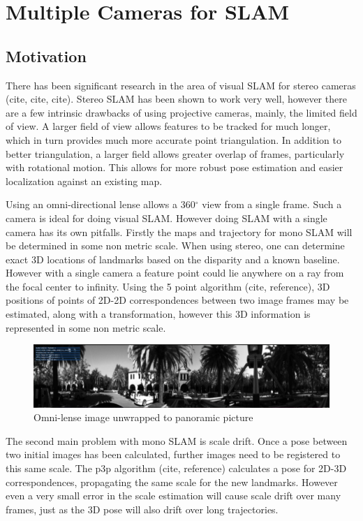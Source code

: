 \chapter{Multiple Cameras for SLAM}
\label{chapter:MultiCamSLAM}

\section{Motivation}

There has been significant research in the area of visual SLAM for stereo cameras (cite, cite, cite).  Stereo SLAM has been shown to work very well, however there are a few intrinsic drawbacks of using projective cameras, mainly, the limited field of view.  A larger field of view allows features to be tracked for much longer, which in turn provides much more accurate point triangulation.  In addition to better triangulation, a larger field allows greater overlap of frames, particularly with rotational motion.  This allows for more robust pose estimation and easier localization against an existing map. %

Using an omni-directional lense allows a 360$^{\circ}$ view from a single frame.  Such a camera is ideal for doing visual SLAM.  However doing SLAM with a single camera has its own pitfalls.  Firstly the maps and trajectory for mono SLAM will be determined in some non metric scale.  When using stereo, one can determine exact 3D locations of landmarks based on the disparity and a known baseline.  However with a single camera a feature point could lie anywhere on a ray from the focal center to infinity.  Using the 5 point algorithm (cite, reference), 3D positions of points of 2D-2D correspondences between two image frames may be estimated, along with a transformation, however this 3D information is represented in some non metric scale.

\begin{figure}[h!]
  \centering
    \includegraphics[width=1.0\textwidth]{chapters/images/unwrapped}
    \caption{Omni-lense image unwrapped to panoramic picture}
  \label{fig:unwrapped}
\end{figure}

The second main problem with mono SLAM is scale drift.  Once a pose between two initial images has been calculated, further images need to be registered to this same scale.  The p3p algorithm (cite, reference) calculates a pose for 2D-3D correspondences, propagating the same scale for the new landmarks.  However even a very small error in the scale estimation will cause scale drift over many frames, just as the 3D pose will also drift over long trajectories.

